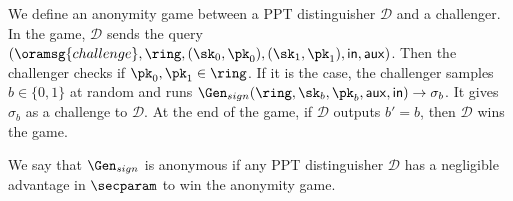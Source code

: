 	\begin{definition}\label{def:anonymity}
		We define an anonymity game between a PPT distinguisher $ \mathcal{D} $ and a challenger.
		In the game, $\mathcal{D}$ sends the query  $ (\oramsg{challenge}, \ring, (\sk_0,\pk_0), (\sk_1, \allowbreak \pk_1), \msg,\aux)$. Then the challenger checks if  $ \pk_0, \pk_1 \in \ring $. If it is the case, the challenger  samples $ b\in \{0,1\}  $ at random and runs $ \Gen_{sign}(\ring, \sk_b, \pk_b,\aux, \msg) \rightarrow \sigma_b $. It gives $ \sigma_b $ as a challenge to $ \mathcal{D} $. At the end of the game, if $ \mathcal{D} $ outputs $ b' = b $, then $\mathcal{D}$ wins the game.
			
		We say that $ \Gen_{sign} $ is anonymous  if any PPT distinguisher $ \mathcal{D} $ has a negligible advantage in $ \secparam $ to win the anonymity game.
	\end{definition}
	
	
	
	
